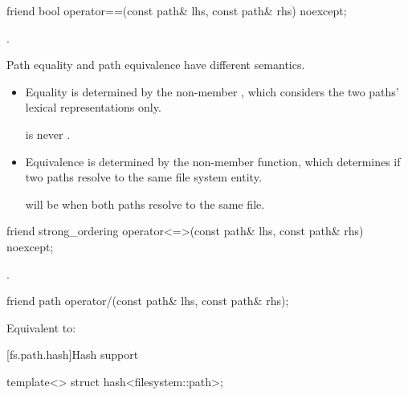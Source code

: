 %
\begin{itemdecl}
friend bool operator==(const path& lhs, const path& rhs) noexcept;
\end{itemdecl}

\begin{itemdescr}
\pnum
\returns
{}.

\pnum
\begin{note}
Path equality and path equivalence have different semantics.
\begin{itemize}
\item Equality is determined by the  non-member ,
which considers the two paths' lexical representations only.
\begin{example}
 is never .
\end{example}
\item Equivalence is determined by the  non-member function, which
determines if two paths resolve to the same file system entity.
\begin{example}
 will be  when both paths resolve to the same file.
\end{example}
\end{itemize}
\end{note}
\end{itemdescr}

%
\begin{itemdecl}
friend strong_ordering operator<=>(const path& lhs, const path& rhs) noexcept;
\end{itemdecl}

\begin{itemdescr}
\pnum
\returns
{}.
\end{itemdescr}

%
\begin{itemdecl}
friend path operator/(const path& lhs, const path& rhs);
\end{itemdecl}

\begin{itemdescr}
\pnum
\effects
Equivalent to: 
\end{itemdescr}

[fs.path.hash]{Hash support}

\begin{itemdecl}
template<> struct hash<filesystem::path>;
\end{itemdecl}

